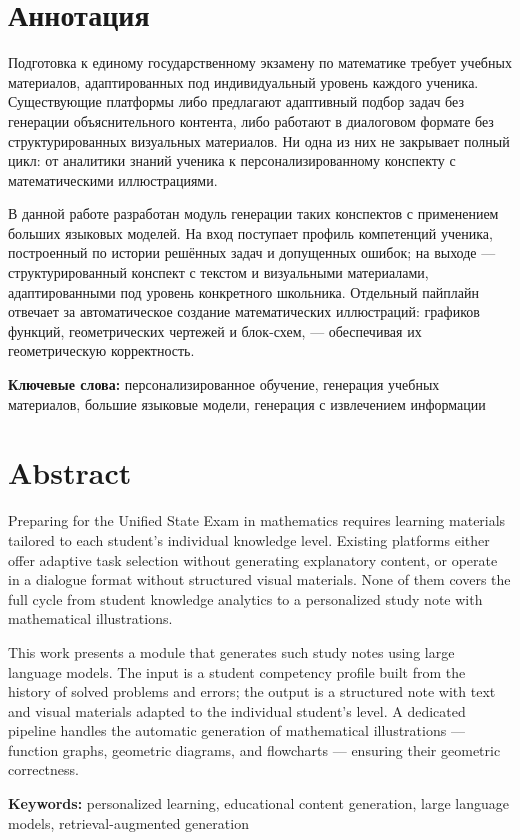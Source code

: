 \section*{Аннотация}

Подготовка к единому государственному экзамену по математике требует учебных
материалов, адаптированных под индивидуальный уровень каждого ученика. Существующие
платформы либо предлагают адаптивный подбор задач без генерации объяснительного
контента, либо работают в диалоговом формате без структурированных визуальных
материалов. Ни одна из них не закрывает полный цикл: от аналитики знаний ученика к
персонализированному конспекту с математическими иллюстрациями.

В данной работе разработан модуль генерации таких конспектов с применением больших языковых моделей. На вход поступает
профиль компетенций ученика, построенный по истории решённых задач и допущенных
ошибок; на выходе --- структурированный конспект с текстом и визуальными материалами,
адаптированными под уровень конкретного школьника. Отдельный пайплайн отвечает за
автоматическое создание математических иллюстраций: графиков функций, геометрических
чертежей и блок-схем, --- обеспечивая их геометрическую корректность.

\medskip
\noindent\textbf{Ключевые слова:} персонализированное обучение, генерация учебных
материалов, большие языковые модели, генерация с извлечением
информации

\section*{Abstract}

Preparing for the Unified State Exam in mathematics requires learning materials
tailored to each student's individual knowledge level. Existing platforms either offer
adaptive task selection without generating explanatory content, or operate in a
dialogue format without structured visual materials. None of them covers the full
cycle from student knowledge analytics to a personalized study note with mathematical
illustrations.

This work presents a module that generates such study notes using large language models. The input is a student
competency profile built from the history of solved problems and errors; the output is
a structured note with text and visual materials adapted to the individual student's
level. A dedicated pipeline handles the automatic generation of mathematical
illustrations --- function graphs, geometric diagrams, and flowcharts --- ensuring
their geometric correctness.

\medskip
\noindent\textbf{Keywords:} personalized learning, educational content generation,
large language models, retrieval-augmented generation